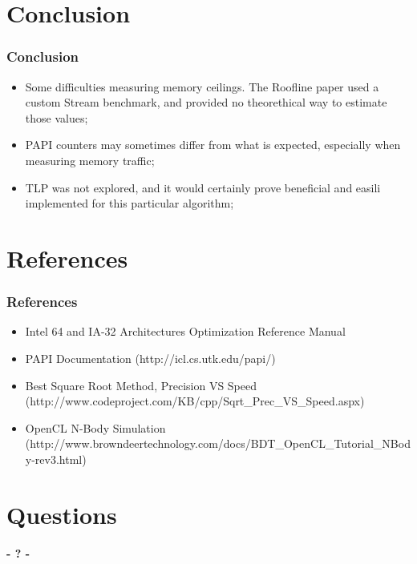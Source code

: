 \documentclass{beamer}
\begin{document}
\section{Conclusion}
\begin{frame}
	\frametitle{Conclusion}
	\begin{itemize}
		\item Some difficulties measuring memory ceilings. The Roofline paper used a custom Stream benchmark, and provided no theorethical way to estimate those values;
		\item PAPI counters may sometimes differ from what is expected, especially when measuring memory traffic;
		\item TLP was not explored, and it would certainly prove beneficial and easili implemented for this particular algorithm;
	\end{itemize}
\end{frame}

\section{References}
\begin{frame}
	\frametitle{References}

	\begin{itemize}
		\item Intel 64 and IA-32 Architectures Optimization Reference Manual
		\item PAPI Documentation (http://icl.cs.utk.edu/papi/)
		\item Best Square Root Method, Precision VS Speed (http://www.codeproject.com/KB/cpp/Sqrt\_Prec\_VS\_Speed.aspx)
		\item OpenCL N-Body Simulation (http://www.browndeertechnology.com/docs/BDT\_OpenCL\_Tutorial\_NBody-rev3.html)
	\end{itemize}
\end{frame}

\section{Questions}
\begin{frame}
	\titlepage
	\begin{center}
		\Huge\bfseries
		- ? -
	\end{center}
\end{frame}
\end{document}
